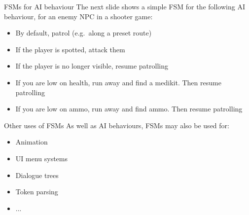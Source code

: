 \begin{frame}{FSMs for AI behaviour}
    The next slide shows a simple FSM for the following AI behaviour, for an enemy NPC in a shooter game: \pause
    \begin{itemize}
        \item By default, patrol (e.g.\ along a preset route) \pause
        \item If the player is spotted, attack them \pause
        \item If the player is no longer visible, resume patrolling \pause
        \item If you are low on health, run away and find a medikit. Then resume patrolling \pause
        \item If you are low on ammo, run away and find ammo. Then resume patrolling 
    \end{itemize}
\end{frame}

\begin{frame}
    \begin{center}\end{center}
\end{frame}

\begin{frame}{Other uses of FSMs}
    As well as AI behaviours, FSMs may also be used for: \pause
    \begin{itemize}
        \item Animation \pause
        \item UI menu systems \pause
        \item Dialogue trees \pause
        \item Token parsing \pause
        \item ...
    \end{itemize}
\end{frame}

